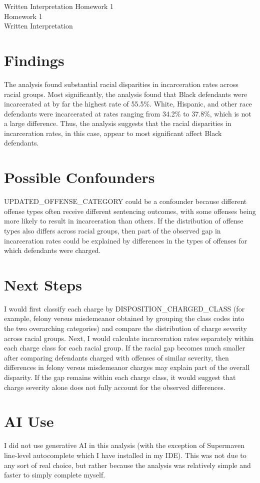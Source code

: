 \documentclass[12pt]{article}
\def\assignment{Homework 1}
\def\byline{Written Interpretation}
\begin{document}
\begingroup
\centering
\ifx\byline\empty
\LARGE\assignment\\[.5em]
\else\LARGE\assignment\\\large\byline\\[0.5em]
\fi
\endgroup
\section{Findings}
The analysis found substantial racial disparities in incarceration rates across racial groups.
Most significantly, the analysis found that Black defendants were incarcerated at by far the highest rate of 55.5\%.
White, Hispanic, and other race defendants were incarcerated at rates ranging from 34.2\% to 37.8\%, which is not a large difference.
Thus, the analysis suggests that the racial disparities in incarceration rates, in this case, appear to most significant affect Black defendants.
\section{Possible Confounders}
UPDATED\_OFFENSE\_CATEGORY could be a confounder because different offense types often receive different sentencing outcomes, with some offenses being more likely to result in incarceration than others. 
If the distribution of offense types also differs across racial groups, then part of the observed gap in incarceration rates could be explained by differences in the types of offenses for which defendants were charged.
\section{Next Steps}
I would first classify each charge by DISPOSITION\_CHARGED\_CLASS (for example, felony versus misdemeanor obtained by grouping the class codes into the two overarching categories) and compare the distribution of charge severity across racial groups. 
Next, I would calculate incarceration rates separately within each charge class for each racial group. 
If the racial gap becomes much smaller after comparing defendants charged with offenses of similar severity, then differences in felony versus misdemeanor charges may explain part of the overall disparity. 
If the gap remains within each charge class, it would suggest that charge severity alone does not fully account for the observed differences.
\section{AI Use}
I did not use generative AI in this analysis (with the exception of Supermaven line-level autocomplete which I have installed in my IDE).
This was not due to any sort of real choice, but rather because the analysis was relatively simple and faster to simply complete myself.
\end{document}
